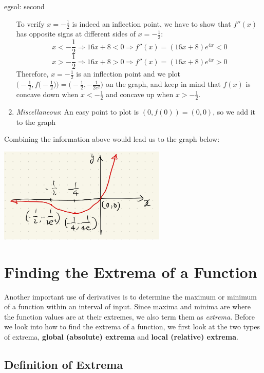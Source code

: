 \begin{egsol}[]{egsol: second}
\begin{enumerate}
        To verify $x = -\frac{1}{2}$ is indeed an inflection point, we have to show that $f''(x)$ has opposite signs at different sides of $x = -\frac{1}{2}$:
        \[x < -\frac{1}{2} \Rightarrow 16x+8 < 0 \Rightarrow f''(x) = (16x+8)e^{4x} < 0\]
        \[x > -\frac{1}{2} \Rightarrow 16x+8 > 0 \Rightarrow f''(x) = (16x+8)e^{4x} > 0\]
        Therefore, $x = -\frac{1}{2}$ is an inflection point and we plot $\big(-\frac{1}{2},f\big(-\frac{1}{2}\big)\big) = \big(-\frac{1}{2},-\frac{1}{2e^2})$ on the graph, and keep in mind that $f(x)$ is concave down when $x < -\frac{1}{2}$ and concave up when $x > -\frac{1}{2}$.
        \item \textit{Miscellaneous}: An easy point to plot is $(0, f(0)) = (0, 0)$, so we add it to the graph
    \end{enumerate}
    
    Combining the information above would lead us to the graph below:
    \begin{center}
        \includegraphics[width = 0.6\textwidth]{figures/chap 05/eg_second_derivative.png}
        \label{fig: eg_second_derivative}
    \end{center}
\end{egsol}

\pagebreak
\section{Finding the Extrema of a Function}

Another important use of derivatives is to determine the maximum or minimum of a function within an interval of input.  Since maxima and minima are where the function values are at their extremes, we also term them as \textit{extrema}.  Before we look into how to find the extrema of a function, we first look at the two types of extrema, \textbf{global (absolute) extrema} and \textbf{local (relative) extrema}.  

\subsection{Definition of Extrema}

